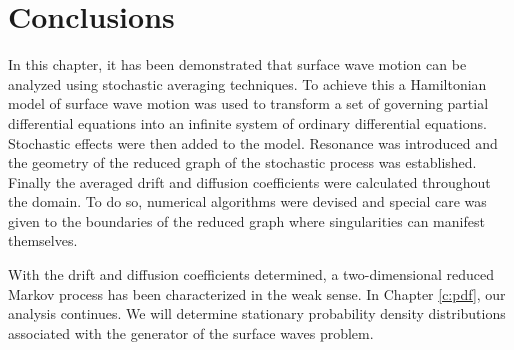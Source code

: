 \section{Conclusions}

In this chapter, it has been demonstrated that surface wave motion can be analyzed using stochastic averaging techniques. To achieve this a Hamiltonian model of surface wave motion was used to transform a set of governing partial differential equations into an infinite system of ordinary differential equations. Stochastic effects were then added to the model. Resonance was introduced and the geometry of the reduced graph of the stochastic process was established. Finally the averaged drift and diffusion coefficients were calculated throughout the domain. To do so, numerical algorithms were devised and special care was given to the boundaries of the reduced graph where singularities can manifest themselves.

With the drift and diffusion coefficients determined, a two-dimensional reduced Markov process has been characterized in the weak sense. In Chapter \ref{c:pdf}, our analysis continues. We will determine stationary probability density distributions associated with the generator of the surface waves problem.



%
